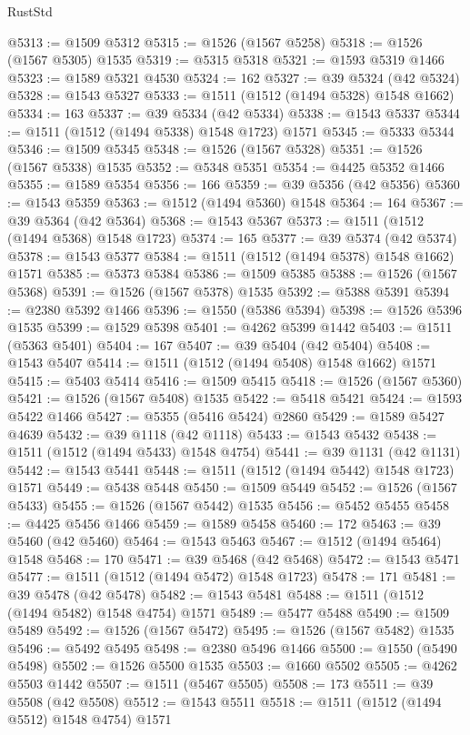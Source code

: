 \begin{lexlean}{RustStd}
\begin{coremodule}
{\begin{coremodule}
{{{{{{{{{{{{{{{{{{{{{{{{{{{{{{{{{{{@5313 := @1509 @5312
@5315 := @1526 (@1567 @5258)
@5318 := @1526 (@1567 @5305) @1535
@5319 := @5315 @5318
@5321 := @1593 @5319 @1466
@5323 := @1589 @5321 @4530
@5324 := 162
@5327 := @39 @5324 (@42 @5324)
@5328 := @1543 @5327
@5333 := @1511 (@1512 (@1494 @5328) @1548 @1662)
@5334 := 163
@5337 := @39 @5334 (@42 @5334)
@5338 := @1543 @5337
@5344 := @1511 (@1512 (@1494 @5338) @1548 @1723) @1571
@5345 := @5333 @5344
@5346 := @1509 @5345
@5348 := @1526 (@1567 @5328)
@5351 := @1526 (@1567 @5338) @1535
@5352 := @5348 @5351
@5354 := @4425 @5352 @1466
@5355 := @1589 @5354
@5356 := 166
@5359 := @39 @5356 (@42 @5356)
@5360 := @1543 @5359
@5363 := @1512 (@1494 @5360) @1548
@5364 := 164
@5367 := @39 @5364 (@42 @5364)
@5368 := @1543 @5367
@5373 := @1511 (@1512 (@1494 @5368) @1548 @1723)
@5374 := 165
@5377 := @39 @5374 (@42 @5374)
@5378 := @1543 @5377
@5384 := @1511 (@1512 (@1494 @5378) @1548 @1662) @1571
@5385 := @5373 @5384
@5386 := @1509 @5385
@5388 := @1526 (@1567 @5368)
@5391 := @1526 (@1567 @5378) @1535
@5392 := @5388 @5391
@5394 := @2380 @5392 @1466
@5396 := @1550 (@5386 @5394)
@5398 := @1526 @5396 @1535
@5399 := @1529 @5398
@5401 := @4262 @5399 @1442
@5403 := @1511 (@5363 @5401)
@5404 := 167
@5407 := @39 @5404 (@42 @5404)
@5408 := @1543 @5407
@5414 := @1511 (@1512 (@1494 @5408) @1548 @1662) @1571
@5415 := @5403 @5414
@5416 := @1509 @5415
@5418 := @1526 (@1567 @5360)
@5421 := @1526 (@1567 @5408) @1535
@5422 := @5418 @5421
@5424 := @1593 @5422 @1466
@5427 := @5355 (@5416 @5424) @2860
@5429 := @1589 @5427 @4639
@5432 := @39 @1118 (@42 @1118)
@5433 := @1543 @5432
@5438 := @1511 (@1512 (@1494 @5433) @1548 @4754)
@5441 := @39 @1131 (@42 @1131)
@5442 := @1543 @5441
@5448 := @1511 (@1512 (@1494 @5442) @1548 @1723) @1571
@5449 := @5438 @5448
@5450 := @1509 @5449
@5452 := @1526 (@1567 @5433)
@5455 := @1526 (@1567 @5442) @1535
@5456 := @5452 @5455
@5458 := @4425 @5456 @1466
@5459 := @1589 @5458
@5460 := 172
@5463 := @39 @5460 (@42 @5460)
@5464 := @1543 @5463
@5467 := @1512 (@1494 @5464) @1548
@5468 := 170
@5471 := @39 @5468 (@42 @5468)
@5472 := @1543 @5471
@5477 := @1511 (@1512 (@1494 @5472) @1548 @1723)
@5478 := 171
@5481 := @39 @5478 (@42 @5478)
@5482 := @1543 @5481
@5488 := @1511 (@1512 (@1494 @5482) @1548 @4754) @1571
@5489 := @5477 @5488
@5490 := @1509 @5489
@5492 := @1526 (@1567 @5472)
@5495 := @1526 (@1567 @5482) @1535
@5496 := @5492 @5495
@5498 := @2380 @5496 @1466
@5500 := @1550 (@5490 @5498)
@5502 := @1526 @5500 @1535
@5503 := @1660 @5502
@5505 := @4262 @5503 @1442
@5507 := @1511 (@5467 @5505)
@5508 := 173
@5511 := @39 @5508 (@42 @5508)
@5512 := @1543 @5511
@5518 := @1511 (@1512 (@1494 @5512) @1548 @4754) @1571
}}}}}}}}}}}}}}}}}}}}}}}}}}}}}}}}}}}
\end{coremodule}}
\end{coremodule}
\end{lexlean}
